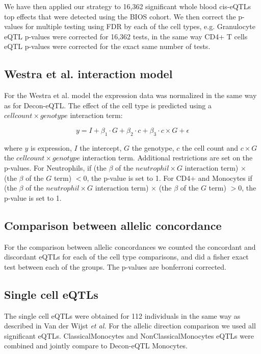 We have then applied our strategy to 16,362 significant whole blood cis-eQTLs top effects that were detected using the BIOS cohort. We then correct the p-values for multiple testing using FDR by each of the cell types, e.g. Granulocyte eQTL p-values were corrected for 16,362 tests, in the same way CD4+ T cells eQTL p-values were corrected for the exact same number of tests.

\subsection{Westra et al. interaction model}
For the Westra et al. model the expression data was normalized in the same way as for Decon-eQTL. The effect of the cell type is predicted using a $cell count \times genotype$ interaction term:

\begin{equation}
y = I + \beta_{1} \cdot G + \beta_{2} \cdot c + \beta_{3} \cdot c \times G + \epsilon 
\end{equation}

where $y$ is expression, $I$ the intercept, $G$ the genotype,  $c$ the cell count and $c \times G$ the $cell count \times genotype$ interaction term. Additional restrictions are set on the p-values. For Neutrophils, if (the $\beta$ of the $neutrophil \times G$ interaction term) $\times$ (the $\beta$ of the $G$ term) $< 0$, the p-value is set to 1. For CD4+ and Monocytes if (the $\beta$ of the $neutrophil \times G$ interaction term) $\times$ (the $\beta$ of the $G$ term) $> 0$, the p-value is set to 1.

\subsection{Comparison between allelic concordance}
For the comparison between allelic concordances we counted the concordant and discordant eQTLs for each of the cell type comparisons, and did a fisher exact test between each of the groups. The p-values are bonferroni corrected.

\subsection{Single cell eQTLs}
The single cell eQTLs were obtained for 112 individuals in the same way as described in Van der Wijst \textit{et al.}\cite{wijstSinglecellRNASequencing2018} For the allelic direction comparison we used all significant eQTLs. ClassicalMonocytes and NonClassicalMonocytes eQTLs were combined and jointly compare to Decon-eQTL Monocytes. 


